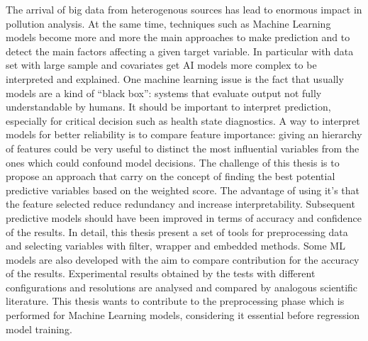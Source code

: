 The arrival of big data from heterogenous sources has lead to enormous impact in pollution analysis.
At the same time, techniques such as Machine Learning models become more and more the main approaches to make prediction and to detect the main factors affecting a given target variable.
In particular with data set with large sample and covariates get AI models more complex to be interpreted and explained.
One machine learning issue is the fact that usually models are a kind of “black box”: systems that evaluate output not fully understandable by humans. 
It should be important to interpret prediction, especially for critical decision such as health state diagnostics.
A way to interpret models for better reliability is to compare feature importance: giving an hierarchy of features could be very useful to distinct the most influential variables from the ones which could confound model decisions.
The challenge of this thesis is to propose an approach that carry on the concept of finding the best potential predictive variables based on the weighted score.
The advantage of using it's that the feature selected reduce redundancy and increase interpretability. 
Subsequent predictive models should have been improved in terms of accuracy and confidence of the results.
In detail, this thesis present a set of tools for preprocessing data and selecting variables with filter, wrapper and embedded methods.
Some ML models are also developed with the aim to compare contribution for the accuracy of the results.
Experimental results obtained by the tests with different configurations and resolutions are analysed and compared by analogous scientific literature.
This thesis wants to contribute to the preprocessing phase which is performed for Machine Learning models, considering it essential before regression model training.
